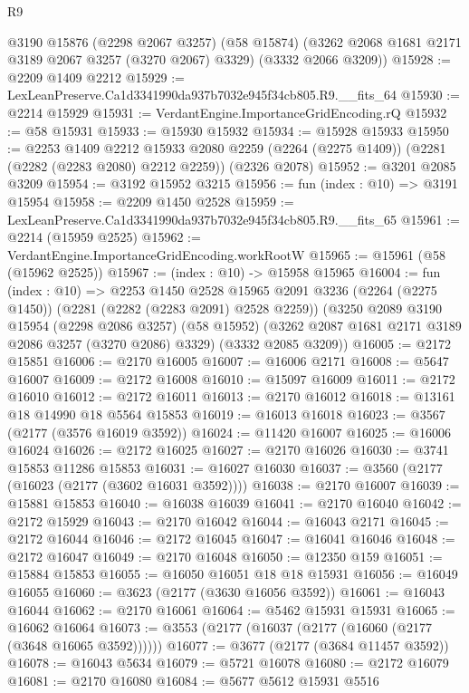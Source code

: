 \begin{lexlean}{R9}
\begin{coremodule}
      @3190
      @15876
      (@2298 @2067 @3257)
      (@58 @15874)
      (@3262 @2068 @1681 @2171 @3189 @2067 @3257 (@3270 @2067) @3329)
      (@3332 @2066 @3209))
@15928 := @2209 @1409 @2212
@15929 := LexLeanPreserve.Ca1d3341990da937b7032e945f34cb805.R9.__fits_64
@15930 := @2214 @15929
@15931 := VerdantEngine.ImportanceGridEncoding.rQ
@15932 := @58 @15931
@15933 := @15930 @15932
@15934 := @15928 @15933
@15950 := @2253
    @1409
    @2212
    @15933
    @2080
    @2259
    (@2264 (@2275 @1409))
    (@2281 (@2282 (@2283 @2080) @2212 @2259))
    (@2326 @2078)
@15952 := @3201 @2085 @3209
@15954 := @3192 @15952 @3215
@15956 := fun (index : @10) => @3191 @15954
@15958 := @2209 @1450 @2528
@15959 := LexLeanPreserve.Ca1d3341990da937b7032e945f34cb805.R9.__fits_65
@15961 := @2214 (@15959 @2525)
@15962 := VerdantEngine.ImportanceGridEncoding.workRootW
@15965 := @15961 (@58 (@15962 @2525))
@15967 := (index : @10) -> @15958 @15965
@16004 := fun (index : @10) =>
  @2253
    @1450
    @2528
    @15965
    @2091
    @3236
    (@2264 (@2275 @1450))
    (@2281 (@2282 (@2283 @2091) @2528 @2259))
    (@3250
      @2089
      @3190
      @15954
      (@2298 @2086 @3257)
      (@58 @15952)
      (@3262 @2087 @1681 @2171 @3189 @2086 @3257 (@3270 @2086) @3329)
      (@3332 @2085 @3209))
@16005 := @2172 @15851
@16006 := @2170 @16005
@16007 := @16006 @2171
@16008 := @5647 @16007
@16009 := @2172 @16008
@16010 := @15097 @16009
@16011 := @2172 @16010
@16012 := @2172 @16011
@16013 := @2170 @16012
@16018 := @13161 @18 @14990 @18 @5564 @15853
@16019 := @16013 @16018
@16023 := @3567 (@2177 (@3576 @16019 @3592))
@16024 := @11420 @16007
@16025 := @16006 @16024
@16026 := @2172 @16025
@16027 := @2170 @16026
@16030 := @3741 @15853 @11286 @15853
@16031 := @16027 @16030
@16037 := @3560 (@2177 (@16023 (@2177 (@3602 @16031 @3592))))
@16038 := @2170 @16007
@16039 := @15881 @15853
@16040 := @16038 @16039
@16041 := @2170 @16040
@16042 := @2172 @15929
@16043 := @2170 @16042
@16044 := @16043 @2171
@16045 := @2172 @16044
@16046 := @2172 @16045
@16047 := @16041 @16046
@16048 := @2172 @16047
@16049 := @2170 @16048
@16050 := @12350 @159
@16051 := @15884 @15853
@16055 := @16050 @16051 @18 @18 @15931
@16056 := @16049 @16055
@16060 := @3623 (@2177 (@3630 @16056 @3592))
@16061 := @16043 @16044
@16062 := @2170 @16061
@16064 := @5462 @15931 @15931
@16065 := @16062 @16064
@16073 := @3553 (@2177 (@16037 (@2177 (@16060 (@2177 (@3648 @16065 @3592))))))
@16077 := @3677 (@2177 (@3684 @11457 @3592))
@16078 := @16043 @5634
@16079 := @5721 @16078
@16080 := @2172 @16079
@16081 := @2170 @16080
@16084 := @5677 @5612 @15931 @5516

\end{coremodule}
\end{lexlean}
